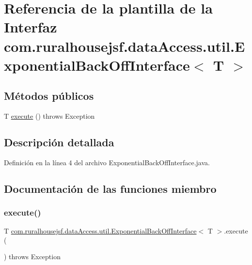 \hypertarget{interfacecom_1_1ruralhousejsf_1_1data_access_1_1util_1_1_exponential_back_off_interface}{}\section{Referencia de la plantilla de la Interfaz com.\+ruralhousejsf.\+data\+Access.\+util.\+Exponential\+Back\+Off\+Interface$<$ T $>$}
\label{interfacecom_1_1ruralhousejsf_1_1data_access_1_1util_1_1_exponential_back_off_interface}
\subsection*{Métodos públicos}
\begin{DoxyCompactItemize}
\item 
T \mbox{\hyperlink{interfacecom_1_1ruralhousejsf_1_1data_access_1_1util_1_1_exponential_back_off_interface_accad03b4334d95d38315690d30f80b17}{execute}} ()  throws Exception
\end{DoxyCompactItemize}


\subsection{Descripción detallada}


Definición en la línea 4 del archivo Exponential\+Back\+Off\+Interface.\+java.



\subsection{Documentación de las funciones miembro}
\mbox{\label{interfacecom_1_1ruralhousejsf_1_1data_access_1_1util_1_1_exponential_back_off_interface_accad03b4334d95d38315690d30f80b17}} 
\subsubsection{\texorpdfstring{execute()}{execute()}}
{\footnotesize\ttfamily T \mbox{\hyperlink{interfacecom_1_1ruralhousejsf_1_1data_access_1_1util_1_1_exponential_back_off_interface}{com.\+ruralhousejsf.\+data\+Access.\+util.\+Exponential\+Back\+Off\+Interface}}$<$ T $>$.execute (\begin{DoxyParamCaption}{ }\end{DoxyParamCaption}) throws Exception}



